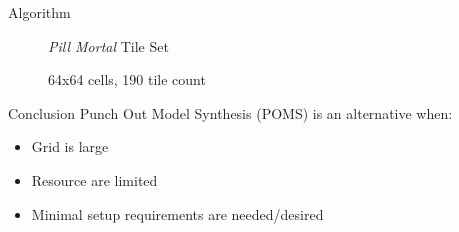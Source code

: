 \documentclass{beamer}
\begin{document}
  \begin{frame}[fragile]{Algorithm}
    \begin{figure}
      \textit{Pill Mortal} Tile Set


      64x64 cells, 190 tile count
    \end{figure}
  \end{frame}






  \begin{frame}[fragile]{Conclusion}
    Punch Out Model Synthesis (POMS) is an alternative when:
    \begin{itemize}
      \item Grid is large
      \item Resource are limited
      \item Minimal setup requirements are needed/desired
    \end{itemize}
  \end{frame}
\end{document}
